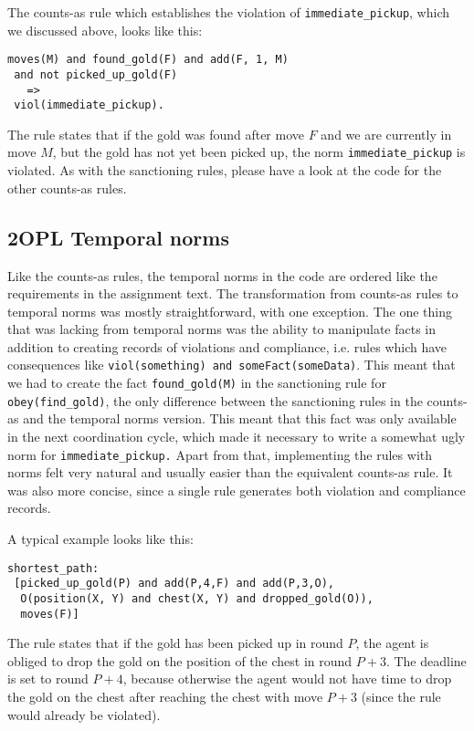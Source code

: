 \documentclass[a4paper,11pt]{article}
\begin{document}
The counts-as rule which establishes the violation of \texttt{immediate\_pickup}, which we discussed above, looks like this:

\begin{lstlisting}[basicstyle=\footnotesize]
moves(M) and found_gold(F) and add(F, 1, M) 
 and not picked_up_gold(F) 
   => 
 viol(immediate_pickup).
\end{lstlisting}

The rule states that if the gold was found after move $F$ and we are currently in move $M$, but the gold has not yet been picked up, the norm \texttt{immediate\_pickup} is violated. As with the sanctioning rules, please have a look at the code for the other counts-as rules.

\subsection{2OPL Temporal norms}
\label{sec:norms}
Like the counts-as rules, the temporal norms in the code are ordered like the requirements in the assignment text. The transformation from counts-as rules to temporal norms was mostly straightforward, with one exception. The one thing that was lacking from temporal norms was the ability to manipulate facts in addition to creating records of violations and compliance, i.e. rules which have consequences like \texttt{viol(something) and someFact(someData)}. This meant that we had to create the fact \texttt{found\_gold(M)} in the sanctioning rule for \texttt{obey(find\_gold)}, the only difference between the sanctioning rules in the counts-as and the temporal norms version. This meant that this fact was only available in the next coordination cycle, which made it necessary to write a somewhat ugly norm for \texttt{immediate\_pickup.} Apart from that, implementing the rules with norms felt very natural and usually easier than the equivalent counts-as rule. It was also more concise, since a single rule generates both violation and compliance records.

A typical example looks like this:

\begin{lstlisting}[basicstyle=\footnotesize]
shortest_path: 
 [picked_up_gold(P) and add(P,4,F) and add(P,3,O), 
  O(position(X, Y) and chest(X, Y) and dropped_gold(O)), 
  moves(F)]
\end{lstlisting}

The rule states that if the gold has been picked up in round $P$, the agent is obliged to drop the gold on the position of the chest in round $P+3$. The deadline is set to round $P+4$, because otherwise the agent would not have time to drop the gold on the chest after reaching the chest with move $P+3$ (since the rule would already be violated).
\end{document}
